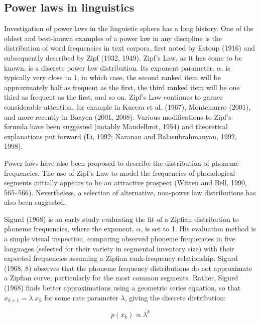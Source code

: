 \hypertarget{power-laws-linguistics}{%
\subsection*{Power laws in linguistics}\label{power-laws-linguistics}}

Investigation of power laws in the linguistic sphere has a long history. One of the oldest and best-known examples of a power law in any discipline is the distribution of word frequencies in text corpora, first noted by Estoup (1916) and subsequently described by Zipf (1932, 1949). Zipf's Law, as it has come to be known, is a discrete power law distribution. Its exponent parameter, \(\alpha\), is typically very close to 1, in which case, the second ranked item will be approximately half as frequent as the first, the third ranked item will be one third as frequent as the first, and so on. Zipf's Law continues to garner considerable attention, for example in Kucera et al. (1967), Montemurro (2001), and more recently in Baayen (2001, 2008). Various modifications to Zipf's formula have been suggested (notably Mandelbrot, 1954) and theoretical explanations put forward (Li, 1992; Naranan and Balasubrahmanyan, 1992, 1998).

Power laws have also been proposed to describe the distribution of phoneme frequencies. The use of Zipf's Law to model the frequencies of phonological segments initially appears to be an attractive prospect (Witten and Bell, 1990, 565--566). Nevertheless, a selection of alternative, non-power law distributions has also been suggested.

Sigurd (1968) is an early study evaluating the fit of a Zipfian distribution to phoneme frequencies, where the exponent, \(\alpha\), is set to 1. His evaluation method is a simple visual inspection, comparing observed phoneme frequencies in five languages (selected for their variety in segmental inventory size) with their expected frequencies assuming a Zipfian rank-frequency relationship. Sigurd (1968, 8) observes that the phoneme frequency distributions do not approximate a Zipfian curve, particularly for the most common segments. Rather, Sigurd (1968) finds better approximations using a geometric series equation, so that \(x_{k+1} = \lambda.x_k\) for some rate parameter \(\lambda\), giving the discrete distribution:

\begin{equation}
p(x_k) \propto \lambda^k
\label{eq:sigurds-geometric}
\end{equation}

